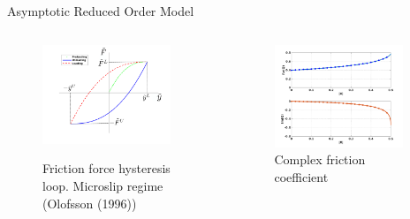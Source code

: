 \documentclass[dvipsnames, aspectratio = 169]{beamer}
\begin{document}
\begin{frame}{Asymptotic Reduced Order Model}
	\begin{columns}
		\begin{column}{0.5\textwidth}
			\begin{figure}[h!]
				\centering
				\includegraphics[width = 0.9\textwidth]{hysteresis_loop.png}
				\label{fig:omega_distributiona}
				\caption{Friction force hysteresis loop. Microslip regime (Olofsson (1996))}
			\end{figure}
		\end{column}
		\begin{column}{0.5\textwidth}
			\begin{figure}[h!]
				\centering
				\includegraphics[width = 0.9\textwidth]{friction_oloffson_coeff.png}
				\caption{Complex friction coefficient}
				\label{fig:complefric}
			\end{figure}
		\end{column}
	\end{columns}
\end{frame}
\end{document}
